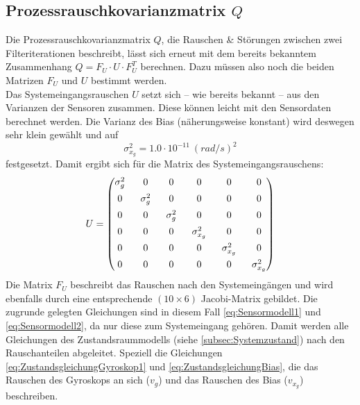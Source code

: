 \documentclass[12pt,a4paper]{article}
\begin{document}
		\subsection{Prozessrauschkovarianzmatrix $Q$}
		Die Prozessrauschkovarianzmatrix $Q$, die Rauschen \& Störungen zwischen zwei Filteriterationen beschreibt, lässt sich erneut mit dem bereits bekanntem Zusammenhang $Q=F_{U}\cdot U\cdot F_{U}^{T}$ berechnen. Dazu müssen also noch die beiden Matrizen $F_{U}$ und $U$ bestimmt werden.\\
		Das Systemeingangsrauschen $U$ setzt sich -- wie bereits bekannt -- aus den Varianzen der Sensoren zusammen. Diese können leicht mit den Sensordaten berechnet werden. Die Varianz des Bias (näherungsweise konstant) wird deswegen sehr klein gewählt und auf 
		\begin{equation}
			\sigma_{x_{g}}^{2}=1.0\cdot 10^{-11}~(rad/s)^{2}
		\end{equation}
		festgesetzt.
		Damit ergibt sich für die Matrix des Systemeingangsrauschens:
		\begin{equation}
			\begin{split}
				U= 
				\setlength{\arraycolsep}{8pt}
				\begin{pmatrix}
				\sigma_{g}^{2} & 0 & 0 & 0 & 0 & 0 \\[0.5em]
				0 & \sigma_{g}^{2} & 0 & 0 & 0 & 0 \\[0.5em]
				0 & 0 & \sigma_{g}^{2} & 0 & 0 & 0 \\[0.5em]
				0 & 0 & 0 & \sigma_{x_{g}}^{2} & 0 & 0 \\[0.5em]
				0 & 0 & 0 & 0 & \sigma_{x_{g}}^{2} & 0 \\[0.5em]
				0 & 0 & 0 & 0 & 0 & \sigma_{x_{g}}^{2}
				\end{pmatrix}
			\end{split}	
		\end{equation}
		Die Matrix $F_{U}$ beschreibt das Rauschen nach den Systemeingängen und wird ebenfalls durch eine entsprechende $(10\times 6)$ Jacobi-Matrix gebildet. Die zugrunde gelegten Gleichungen sind in diesem Fall \ref{eq:Sensormodell1} und \ref{eq:Sensormodell2}, da nur diese zum Systemeingang gehören. Damit werden alle Gleichungen des Zustandsraummodells (siehe \ref{subsec:Systemzustand}) nach den Rauschanteilen abgeleitet. Speziell die Gleichungen \ref{eq:ZustandsgleichungGyroskop1} und \ref{eq:ZustandsgleichungBias}, die das Rauschen des Gyroskops an sich ($v_{g}$) und das Rauschen des Bias ($v_{x_{g}}$) beschreiben.
\end{document}
